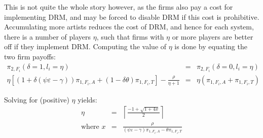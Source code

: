 \documentclass[letter,12pt]{article}
\numberwithin{equation}{section}
\newcommand{\firmpayoff}[2]{\pi_{{#1}, F_{#2}}}
\newcommand{\firmalbum}[2]{\pi_{#1, F_{#2}, A}}
\newcommand{\firmticket}[2]{\pi_{#1, F_{#2}, T}}
\newcommand{\drminf}{(\psi \varepsilon - \gamma)}
\def\lc{\left\lceil}
\def\rc{\right\rceil}
\begin{document}
This is not quite the whole story however, as the firms also pay a cost for implementing DRM, and may be forced to disable DRM if this cost is prohibitive. Accumulating more artists reduces the cost of DRM, and hence for each system, there is a number of players $\eta$, such that firms with $\eta$ or more players are better off if they implement DRM. Computing the value of $\eta$ is done by equating the two firm payoffs:
\begin{eqnarray*}
\firmpayoff{2}{i}(\delta = 1, l_i = \eta) & = & \firmpayoff{2}{i}(\delta = 0, l_i = \eta)\\
\eta \left[\left(1 + \delta \drminf\right) \firmalbum{1}{i} + (1 - \delta \theta) \firmticket{1}{i}\right] - \frac{\rho}{\eta + 1} & = & \eta (\firmalbum{1}{i} + \firmticket{1}{i})
\end{eqnarray*}

Solving for (positive) $\eta$ yields:
\begin{eqnarray}
\eta & = & \lc \frac{-1 + \sqrt{1 + 4 x}}{2} \rc \\
\text{where } x & = & \frac{\rho}{\drminf \firmalbum{1}{i} - \theta \firmticket{1}{i}} \nonumber
\end{eqnarray}
\end{document}
